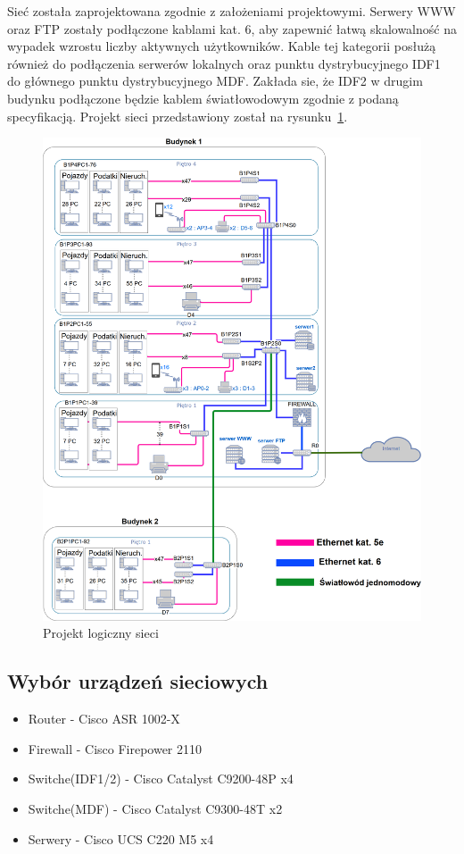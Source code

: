 \documentclass[12pt,a4paper]{article}
\begin{document}
	    Sieć została zaprojektowana zgodnie z założeniami projektowymi.
	    Serwery WWW oraz FTP zostały podłączone kablami kat. 6, aby zapewnić łatwą skalowalność na wypadek wzrostu liczby aktywnych użytkowników.
	    Kable tej kategorii posłużą również do podłączenia serwerów lokalnych oraz punktu dystrybucyjnego IDF1 do głównego punktu dystrybucyjnego MDF.
	    Zakłada sie, że IDF2 w drugim budynku podłączone będzie kablem światłowodowym zgodnie z podaną specyfikacją.
	    Projekt sieci przedstawiony został na rysunku~\ref{fig:projekt}.
	\begin{figure}[h]
	    \centering
	    \includegraphics[width = \textwidth]{obrazki/diag.png}
	    \caption{Projekt logiczny sieci}
	    \label{fig:projekt}
	\end{figure}
	    
	\subsection{Wybór urządzeń sieciowych}
	
	\begin{itemize}
		\item Router - Cisco ASR 1002-X
		\item Firewall - Cisco Firepower 2110
		\item Switche(IDF1/2) - Cisco Catalyst C9200-48P x4
		\item Switche(MDF) - Cisco Catalyst C9300-48T x2
		\item Serwery - Cisco UCS C220 M5 x4
	\end{itemize}
	    
\end{document}
